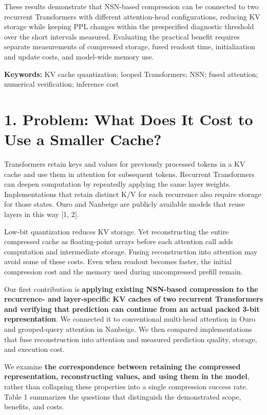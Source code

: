 \documentclass[10pt,a4paper]{article}
\begin{document}
These results demonstrate that NSN-based compression can be connected to two recurrent Transformers with different attention-head configurations, reducing KV storage while keeping PPL changes within the prespecified diagnostic threshold over the short intervals measured. Evaluating the practical benefit requires separate measurements of compressed storage, fused readout time, initialization and update costs, and model-wide memory use.

\textbf{Keywords:} KV cache quantization; looped Transformers; NSN; fused attention; numerical verification; inference cost

\clearpage

\section{1. Problem: What Does It Cost to Use a Smaller Cache?}\label{problem-what-does-it-cost-to-use-a-smaller-cache}

Transformers retain keys and values for previously processed tokens in a KV cache and use them in attention for subsequent tokens. Recurrent Transformers can deepen computation by repeatedly applying the same layer weights. Implementations that retain distinct K/V for each recurrence also require storage for those states. Ouro and Nanbeige are publicly available models that reuse layers in this way {[}1, 2{]}.

Low-bit quantization reduces KV storage. Yet reconstructing the entire compressed cache as floating-point arrays before each attention call adds computation and intermediate storage. Fusing reconstruction into attention may avoid some of these costs. Even when readout becomes faster, the initial compression cost and the memory used during uncompressed prefill remain.

Our first contribution is \textbf{applying existing NSN-based compression to the recurrence- and layer-specific KV caches of two recurrent Transformers and verifying that prediction can continue from an actual packed 3-bit representation}. We connected it to conventional multi-head attention in Ouro and grouped-query attention in Nanbeige. We then compared implementations that fuse reconstruction into attention and measured prediction quality, storage, and execution cost.

We examine \textbf{the correspondence between retaining the compressed representation, reconstructing values, and using them in the model}, rather than collapsing these properties into a single compression success rate. Table 1 summarizes the questions that distinguish the demonstrated scope, benefits, and costs.
\end{document}
